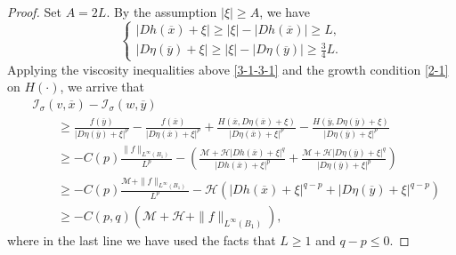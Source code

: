 \documentclass[11pt,reqno]{amsart}
\numberwithin{equation}{section}
\begin{document}
\begin{proof}
Set $A=2L$. By the assumption $|\xi|\ge A$, we have
\begin{equation*}
\begin{cases}
|Dh(\overline{x})+\xi|\ge |\xi|-|Dh(\overline{x})|\ge L,   \\
|D\eta(\overline{y})+\xi|\ge |\xi|-|D\eta(\overline{y})|\ge \frac{3}{4}L.
\end{cases}
\end{equation*}
Applying the viscosity inequalities above \eqref{3-1-3-1} and the growth condition \eqref{2-1} on $H(\cdot)$, we arrive that
\begin{align}
\label{3-1-4}
&\mathcal{I}_\sigma(v,\overline{x})-\mathcal{I}_\sigma(w,\overline{y}) \nonumber\\
&\qquad\ge\frac{f(\overline{y})}{|D\eta(\overline{y})+\xi|^p}-
\frac{f(\overline{x})}{|D\eta(\overline{x})+\xi|^p}+\frac{H(\overline{x},D\eta(\overline{x})+\xi)}{|D\eta(\overline{x})+\xi|^p}-
\frac{H(\overline{y},D\eta(\overline{y})+\xi)}{|D\eta(\overline{y})+\xi|^p} \nonumber\\
&\qquad\ge-C(p)\frac{\|f\|_{L^\infty(B_1)}}{L^p}-\left(\frac{\mathcal{M}+\mathcal{H}|Dh(\overline{x})+\xi|^q}{|Dh(\overline{x})+\xi|^p}+
\frac{\mathcal{M}+\mathcal{H}|D\eta(\overline{y})+\xi|^q}{|D\eta(\overline{y})+\xi|^p}\right) \nonumber\\
&\qquad\ge-C(p)\frac{\mathcal{M}+\|f\|_{L^\infty(B_1)}}{L^p}-\mathcal{H}\left(|Dh(\overline{x})+\xi|^{q-p}+|D\eta(\overline{y})+\xi|^{q-p}\right) \nonumber\\
&\qquad\ge-C(p,q)(\mathcal{M}+\mathcal{H}+\|f\|_{L^\infty(B_1)}),
\end{align}
where in the last line we have used the facts that $L\ge1$ and $q-p\le0$.


\end{proof}
\end{document}
